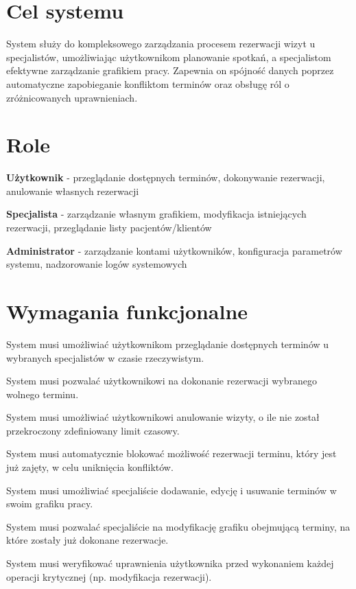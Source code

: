 \documentclass[12pt,a4paper]{article}
\begin{document}
\section{Cel systemu}
System służy do kompleksowego zarządzania procesem rezerwacji wizyt u specjalistów, umożliwiając użytkownikom planowanie spotkań, a specjalistom efektywne zarządzanie grafikiem pracy. Zapewnia on spójność danych poprzez automatyczne zapobieganie konfliktom terminów oraz obsługę ról o zróżnicowanych uprawnieniach.

\section{Role}
\begin{imtemize}
    \item \textbf{Użytkownik} - przeglądanie dostępnych terminów, dokonywanie rezerwacji, anulowanie własnych rezerwacji
    \item \textbf{Specjalista} - zarządzanie własnym grafikiem, modyfikacja istniejących rezerwacji, przeglądanie listy pacjentów/klientów
    \item \textbf{Administrator} - zarządzanie kontami użytkowników, konfiguracja parametrów systemu, nadzorowanie logów systemowych
\end{imtemize}


\section{Wymagania funkcjonalne}
\begin{description}[leftmargin=1.8cm, labelwidth=1.3cm, labelsep=0.5cm]
    \item[FR1] System musi umożliwiać użytkownikom przeglądanie dostępnych terminów u wybranych specjalistów w czasie rzeczywistym.
    \item[FR2] System musi pozwalać użytkownikowi na dokonanie rezerwacji wybranego wolnego terminu.
    \item[FR3] System musi umożliwiać użytkownikowi anulowanie wizyty, o ile nie został przekroczony zdefiniowany limit czasowy.
    \item[FR4] System musi automatycznie blokować możliwość rezerwacji terminu, który jest już zajęty, w celu uniknięcia konfliktów.
    \item[FR5] System musi umożliwiać specjaliście dodawanie, edycję i usuwanie terminów w swoim grafiku pracy.
    \item[FR6] System musi pozwalać specjaliście na modyfikację grafiku obejmującą terminy, na które zostały już dokonane rezerwacje.
    \item[FR7] System musi weryfikować uprawnienia użytkownika przed wykonaniem każdej operacji krytycznej (np. modyfikacja rezerwacji).
\end{description}
\end{document}
